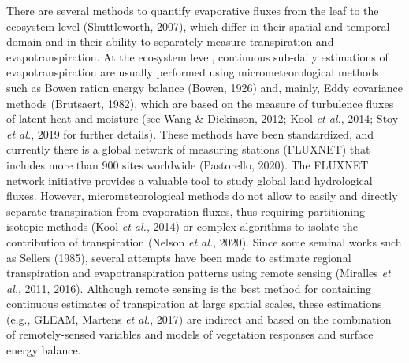 \documentclass[11pt,twoside]{reedthesis}
\begin{document}
There are several methods to quantify evaporative fluxes from the leaf
to the ecosystem level (Shuttleworth, 2007), which differ in their
spatial and temporal domain and in their ability to separately measure
transpiration and evapotranspiration. At the ecosystem level, continuous
sub-daily estimations of evapotranspiration are usually performed using
micrometeorological methods such as Bowen ration energy balance (Bowen,
1926) and, mainly, Eddy covariance methods (Brutsaert, 1982), which are
based on the measure of turbulence fluxes of latent heat and moisture
(see Wang \& Dickinson, 2012; Kool \emph{et al.}, 2014; Stoy \emph{et
al.}, 2019 for further details). These methods have been standardized,
and currently there is a global network of measuring stations (FLUXNET)
that includes more than 900 sites worldwide (Pastorello, 2020). The
FLUXNET network initiative provides a valuable tool to study global land
hydrological fluxes. However, micrometeorological methods do not allow
to easily and directly separate transpiration from evaporation fluxes,
thus requiring partitioning isotopic methods (Kool \emph{et al.}, 2014)
or complex algorithms to isolate the contribution of transpiration
(Nelson \emph{et al.}, 2020). Since some seminal works such as Sellers
(1985), several attempts have been made to estimate regional
transpiration and evapotranspiration patterns using remote sensing
(Miralles \emph{et al.}, 2011, 2016). Although remote sensing is the
best method for containing continuous estimates of transpiration at
large spatial scales, these estimations (e.g., GLEAM, Martens \emph{et
al.}, 2017) are indirect and based on the combination of remotely-sensed
variables and models of vegetation responses and surface energy
balance.\par
\end{document}
